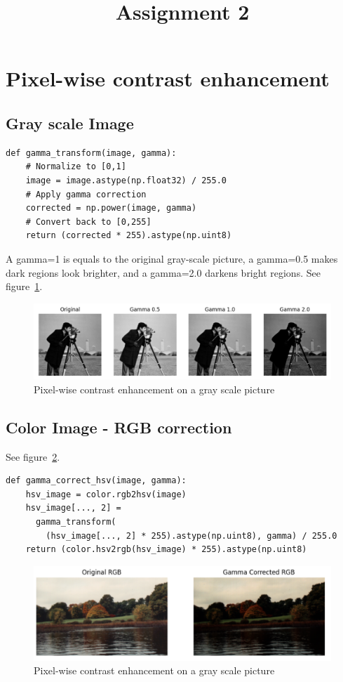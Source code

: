 \documentclass[12pt]{article}
\title{Assignment 2}
\begin{document}
\maketitle

\section{Pixel-wise contrast enhancement}
\subsection{Gray scale Image}
\begin{lstlisting}
def gamma_transform(image, gamma):
    # Normalize to [0,1]
    image = image.astype(np.float32) / 255.0 
    # Apply gamma correction
    corrected = np.power(image, gamma) 
    # Convert back to [0,255]
    return (corrected * 255).astype(np.uint8) 
\end{lstlisting}

A gamma=1 is equals to the original gray-scale picture, a gamma=0.5 makes dark regions look brighter, and a gamma=2.0 darkens bright regions. See figure~\ref{fig:1.1}.

\begin{figure}[ht]
\centering
    \includegraphics[width=1\columnwidth, keepaspectratio]{pics/a2-1.1}
\caption[]{Pixel-wise contrast enhancement on a gray scale picture}
\label{fig:1.1}
\end{figure}

\subsection{Color Image - RGB correction}

 See figure~\ref{fig:1.2}.

\begin{lstlisting}
def gamma_correct_hsv(image, gamma):
    hsv_image = color.rgb2hsv(image)
    hsv_image[..., 2] = 
      gamma_transform(
      	(hsv_image[..., 2] * 255).astype(np.uint8), gamma) / 255.0
    return (color.hsv2rgb(hsv_image) * 255).astype(np.uint8)
\end{lstlisting}
\begin{figure}[ht]
\centering
    \includegraphics[width=1\columnwidth, keepaspectratio]{pics/a2-1.2}
\caption[]{Pixel-wise contrast enhancement on a gray scale picture}
\label{fig:1.2}
\end{figure}
\end{document}
